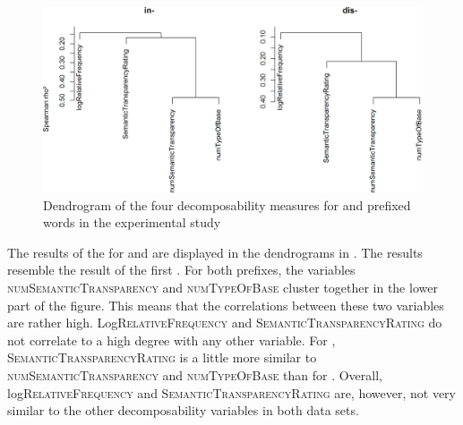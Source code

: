  
 

 

  \begin{figure}
  	
  	\includegraphics[scale=0.5]{images/Experiment/clusterAnalysisDecomposabilityExpDisAndIn.png}
  	\caption{ Dendrogram of the four decomposability measures for  and prefixed words in the experimental study}
  	\label{fig:cluster experiment dis and in}
  \end{figure}
  
 The results of the  for  and  are displayed in the dendrograms in . The results resemble the result of the first .
 For both prefixes, the variables \textsc{numSemanticTransparency} and \textsc{numTypeOfBase} cluster together in the lower part of the figure. This means that the correlations between these two variables are rather high. Log\textsc{RelativeFrequency} and \textsc{SemanticTransparencyRating} do not correlate to a high degree with any other variable.
 For , \textsc{SemanticTransparencyRating} is a little more similar to \textsc{numSemanticTransparency} and \textsc{numTypeOfBase} than for . 
 Overall, log\textsc{RelativeFrequency} and \textsc{SemanticTransparencyRating} are, however, not very similar to the other decomposability variables in both data sets. 

